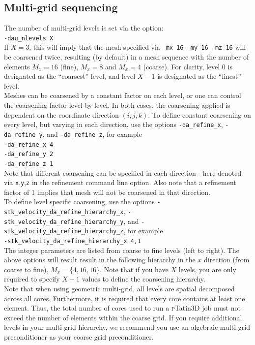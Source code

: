 \documentclass[paper=a4, fontsize=11pt,twoside]{scrartcl}
\newcommand{\ptat}{{{\textsc pTatin3D}}}
\newcommand{\shellcmd}[1]{\\\indent\indent\texttt{\hspace{5mm}\footnotesize #1}\\}
\newcommand{\unix}[1]{\texttt{\footnotesize #1}}
\begin{document}
{{\subsection{Multi-grid sequencing}
The number of multi-grid levels is set via the option:
\shellcmd{-dau\_nlevels X}
If $X = 3$, this will imply that the mesh specified via \unix{-mx 16 -my 16 -mz 16} will be coarsened twice, resulting (by default) in a mesh sequence with the number of elements $M_x = 16$ (fine), $M_x = 8$ and $M_x = 4$ (coarse). For clarity, level 0 is designated as the ``coarsest'' level, and level $X-1$ is designated as the ``finest'' level.
\\[8pt]
Meshes can be coarsened by a constant factor on each level, or one can control the coarsening factor level-by level.
In both cases, the coarsening applied is dependent on the coordinate direction $(i,j,k)$. 
To define constant coarsening on every level, but varying in each direction, use the options 
\unix{-da\_refine\_x}, \unix{-da\_refine\_y}, and \unix{-da\_refine\_z}, for example
\shellcmd{-da\_refine\_x 4\\
\indent\indent\texttt{\hspace{5mm}}-da\_refine\_y 2 \\
\indent\indent\texttt{\hspace{5mm}}-da\_refine\_z 1}
Note that different coarsening can be specified in each direction - here denoted via \unix{x},\unix{y},\unix{z} in the refinement command line option.
Also note that a refinement factor of 1 implies that mesh will not be coarsened in that direction. 
\\[8pt]
To define level specific coarsening, use the options 
\unix{-stk\_velocity\_da\_refine\_hierarchy\_x}, 
\unix{-stk\_velocity\_da\_refine\_hierarchy\_y}, and
\unix{-stk\_velocity\_da\_refine\_hierarchy\_z}, for example
\shellcmd{-stk\_velocity\_da\_refine\_hierarchy\_x 4,1}
The integer parameters are listed from coarse to fine levels (left to right). 
The above options will result result in the following hierarchy in the $x$ direction (from coarse to fine), $M_x = \{ 4, 16, 16 \}$.
Note that if you have $X$ levels, you are only required to specify $X-1$ values to define the coarsening hierarchy. 
\\[8pt]
Note that when using geometric multi-grid, all levels are spatial decomposed across all cores. Furthermore, it is required that every core contains at least one element. Thus, the total number of cores used to run a {\ptat} job must not exceed the number of elements within the coarse grid. If you require additional levels in your multi-grid hierarchy, we recommend you use an algebraic multi-grid preconditioner as your coarse grid preconditioner.

}}
\end{document}
